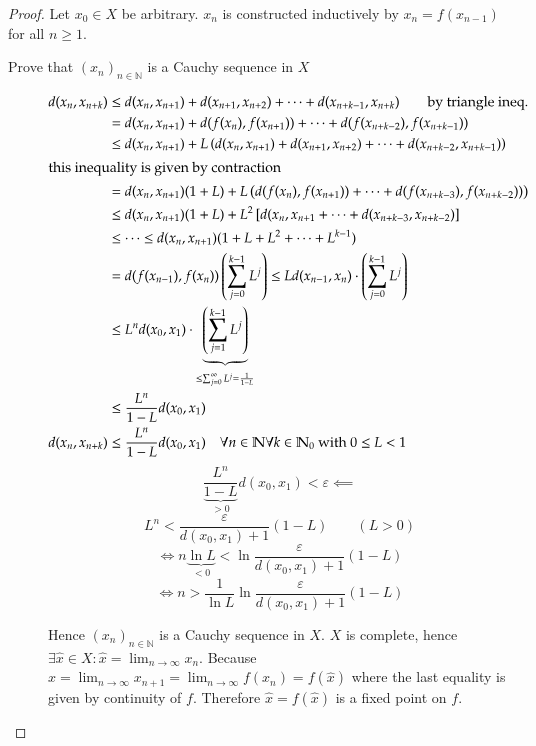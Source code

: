 \documentclass{article}
\begin{document}
\begin{proof}
  Let $x_0 \in X$ be arbitrary.
  $x_n$ is constructed inductively by $x_n = f(x_{n-1})$ for all $n \geq 1$.

  \begin{description}
    \item[Prove that $(x_n)_{n \in \mathbb N}$ is a Cauchy sequence in $X$]
      \begin{align*}
        d(x_n, x_{n+k}) &\leq d(x_n, x_{n+1}) + d(x_{n+1}, x_{n+2}) + \dots + d(x_{n+k-1}, x_{n+k}) \qquad \text{by triangle ineq.} \\
          &= d(x_n, x_{n+1}) + d(f(x_n), f(x_{n+1})) + \dots + d(f(x_{n+k-2}), f(x_{n+k-1})) \\
          &\leq d(x_n, x_{n+1}) + L\left(d(x_n, x_{n+1}) + d(x_{n+1}, x_{n+2}) + \dots + d(x_{n+k-2}, x_{n+k-1})\right) \\
      \intertext{this inequality is given by contraction}
          &= d(x_n, x_{n+1}) (1 + L) + L \left(d(f(x_n), f(x_{n+1})) + \dots + d(f(x_{n+k-3}), f(x_{n+k-2}))\right) \\
          &\leq d(x_n, x_{n+1}) (1 + L) + L^2 \left[d(x_n, x_{n+1} + \dots + d(x_{n + k - 3}, x_{n+k-2})\right] \\
          &\leq \dots \leq d(x_n, x_{n+1}) (1 + L + L^2 + \dots + L^{k-1}) \\
          &= d(f(x_{n-1}), f(x_n)) \left(\sum_{j=0}^{k-1} L^j\right) \leq L d(x_{n-1}, x_n) \cdot \left(\sum_{j=0}^{k-1} L^j\right) \\
          &\leq L^n d(x_0, x_1) \cdot \underbrace{\left(\sum_{j=1}^{k-1} L^j\right)}_{\leq \sum_{j=0}^\infty L^j = \frac{1}{1 - L}} \\
          &\leq \frac{L^n}{1 - L} d(x_0, x_1) \\
        d(x_n, x_{n+k}) &\leq \frac{L^n}{1 - L} d(x_0, x_1) \quad \forall n \in \mathbb N \forall k \in \mathbb N_0 \text{ with } 0 \leq L < 1
      \end{align*}
      \[ \frac{L^n}{\underbrace{1 - L}_{> 0}} d(x_0, x_1) < \varepsilon \impliedby \]
      \[ L^n < \frac{\varepsilon}{d(x_0, x_1) + 1} (1 - L) \qquad (L > 0) \]
      \[ \iff n \underbrace{\ln{L}}_{<0} < \ln \frac{\varepsilon}{d(x_0, x_1) + 1} (1 - L) \]
      \[ \iff n > \frac{1}{\ln{L}} \ln \frac{\varepsilon}{d(x_0, x_1) + 1} (1 - L) \]

      Hence $(x_n)_{n \in \mathbb N}$ is a Cauchy sequence in $X$. $X$ is complete, hence $\exists \hat{x} \in X: \hat{x} = \lim_{n \to \infty} x_n$.
      Because $\hat{x} = \lim_{n\to\infty} x_{n+1} = \lim_{n\to\infty} f(x_n) = f(\hat{x})$ where the last equality is given by continuity of $f$.
      Therefore $\hat{x} = f(\hat{x})$ is a fixed point on $f$.


\end{description}
\end{proof}
\end{document}
